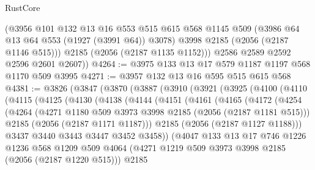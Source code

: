 \begin{lexlean}{RustCore}
\begin{coremodule}
          (@3956
            @101
            @132
            @13
            @16
            @553
            @515
            @615
            @568
            @1145
            @509
            (@3986 @64 @13 @64 @553 (@1927 (@3991 @64)) @3078)
            @3998
            @2185
            (@2056 (@2187 @1146 @515)))
          @2185
          (@2056 (@2187 @1135 @1152)))
        @2586
        @2589
        @2592
        @2596
        @2601
        @2607))
@4264 := @3975 @133 @13 @17 @579 @1187 @1197 @568 @1170 @509 @3995
@4271 := @3957 @132 @13 @16 @595 @515 @615 @568
@4381 := @3826
    (@3847
      (@3870
        (@3887
          (@3910
            (@3921
              (@3925
                (@4100
                  (@4110
                    (@4115
                      (@4125
                        (@4130
                          (@4138
                            (@4144
                              (@4151
                                (@4161
                                  (@4165
                                    (@4172
                                      (@4254
                                        (@4264
                                          (@4271
                                            @1180
                                            @509
                                            @3973
                                            @3998
                                            @2185
                                            (@2056 (@2187 @1181 @515)))
                                          @2185
                                          (@2056 (@2187 @1171 @1187)))
                                        @2185
                                        (@2056 (@2187 @1127 @1188)))
                                      @3437
                                      @3440
                                      @3443
                                      @3447
                                      @3452
                                      @3458))
                                  (@4047
                                    @133
                                    @13
                                    @17
                                    @746
                                    @1226
                                    @1236
                                    @568
                                    @1209
                                    @509
                                    @4064
                                    (@4271 @1219 @509 @3973 @3998 @2185 (@2056 (@2187 @1220 @515)))
                                    @2185

\end{coremodule}
\end{lexlean}
